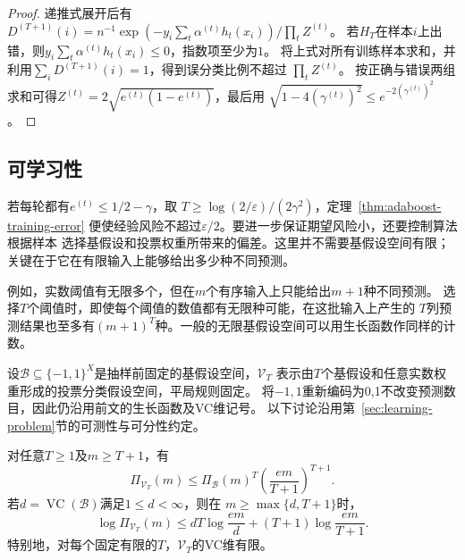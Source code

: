 \begin{proof}
递推式展开后有
$D^{(T+1)}(i)=n^{-1}\exp(-y_i\sum_t\alpha^{(t)} h_t(x_i))/\prod_tZ^{(t)}$。
若$H_T$在样本$i$上出错，则$y_i\sum_t\alpha^{(t)} h_t(x_i)\leq0$，指数项至少为$1$。
将上式对所有训练样本求和，并利用$\sum_iD^{(T+1)}(i)=1$，得到误分类比例不超过
$\prod_tZ^{(t)}$。
按正确与错误两组求和可得$Z^{(t)}=2\sqrt{e^{(t)}(1-e^{(t)})}$，最后用
$\sqrt{1-4(\gamma^{(t)})^2}\leq e^{-2(\gamma^{(t)})^2}$。
\end{proof}

\subsection{可学习性}

若每轮都有$e^{(t)}\leq1/2-\gamma$，取
$T\geq\log(2/\varepsilon)/(2\gamma^2)$，定理~\ref{thm:adaboost-training-error}
便使经验风险不超过$\varepsilon/2$。要进一步保证期望风险小，还要控制算法根据样本
选择基假设和投票权重所带来的偏差。这里并不需要基假设空间有限；
关键在于它在有限输入上能够给出多少种不同预测。

例如，实数阈值有无限多个，但在$m$个有序输入上只能给出$m+1$种不同预测。
选择$T$个阈值时，即使每个阈值的数值都有无限种可能，在这批输入上产生的
$T$列预测结果也至多有$(m+1)^T$种。一般的无限基假设空间可以用生长函数作同样的计数。

设$\mathcal B\subseteq\{-1,1\}^X$是抽样前固定的基假设空间，$\mathcal V_T$
表示由$T$个基假设和任意实数权重形成的投票分类假设空间，平局规则固定。
将$-1,1$重新编码为0,1不改变预测数目，因此仍沿用前文的生长函数及VC维记号。
以下讨论沿用第~\ref{sec:learning-problem}节的可测性与可分性约定。

\begin{theorem}[投票假设空间的生长函数]
\label{thm:vote-growth-infinite}
对任意$T\geq1$及$m\geq T+1$，有
\begin{equation}
 \Pi_{\mathcal V_T}(m)
 \leq\Pi_{\mathcal B}(m)^T
       \left(\frac{em}{T+1}\right)^{T+1}.
 \label{eq:boosting-vote-growth}
\end{equation}
若$d=\operatorname{VC}(\mathcal B)$满足$1\leq d<\infty$，则在
$m\geq\max\{d,T+1\}$时，
\begin{equation}
 \log\Pi_{\mathcal V_T}(m)
 \leq dT\log\frac{em}{d}+(T+1)\log\frac{em}{T+1}.
 \label{eq:infinite-boosting-growth}
\end{equation}
特别地，对每个固定有限的$T$，$\mathcal V_T$的VC维有限。
\end{theorem}

